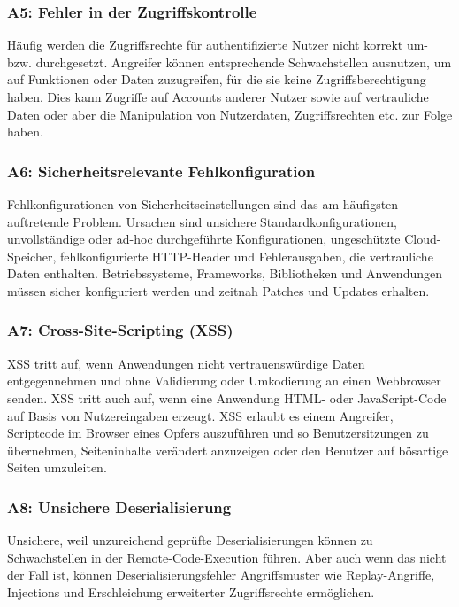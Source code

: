 \documentclass[12pt,oneside,a4paper,parskip]{scrbook}
\begin{document}
    \subsubsection{A5: Fehler in der Zugriffskontrolle}
    Häufig werden die Zugriffsrechte für authentifizierte Nutzer nicht korrekt um- bzw. durchgesetzt.
    Angreifer können entsprechende Schwachstellen ausnutzen, um auf Funktionen oder Daten
    zuzugreifen, für die sie keine Zugriffsberechtigung haben. Dies kann Zugriffe auf Accounts
    anderer Nutzer sowie auf vertrauliche Daten oder aber die Manipulation von Nutzerdaten,
    Zugriffsrechten etc. zur Folge haben.

    \subsubsection{A6: Sicherheitsrelevante Fehlkonfiguration}
    Fehlkonfigurationen von Sicherheitseinstellungen sind das am häufigsten auftretende Problem.
    Ursachen sind unsichere Standardkonfigurationen, unvollständige oder ad-hoc durchgeführte
    Konfigurationen, ungeschützte Cloud-Speicher, fehlkonfigurierte HTTP-Header und Fehlerausgaben,
    die vertrauliche Daten enthalten. Betriebssysteme, Frameworks, Bibliotheken und Anwendungen
    müssen sicher konfiguriert werden und zeitnah Patches und Updates erhalten.

    \subsubsection{A7: Cross-Site-Scripting (XSS)}
    XSS tritt auf, wenn Anwendungen nicht vertrauenswürdige Daten entgegennehmen und ohne
    Validierung oder Umkodierung an einen Webbrowser senden. XSS tritt auch auf, wenn eine
    Anwendung HTML- oder JavaScript-Code auf Basis von Nutzereingaben erzeugt. XSS erlaubt es
    einem Angreifer, Scriptcode im Browser eines Opfers auszuführen und so Benutzersitzungen zu
    übernehmen, Seiteninhalte verändert anzuzeigen oder den Benutzer auf bösartige Seiten
    umzuleiten.

    \subsubsection{A8: Unsichere Deserialisierung}
    Unsichere, weil unzureichend geprüfte Deserialisierungen können zu Schwachstellen in der
    Remote-Code-Execution führen. Aber auch wenn das nicht der Fall ist, können
    Deserialisierungsfehler Angriffsmuster wie Replay-Angriffe, Injections und Erschleichung
    erweiterter Zugriffsrechte ermöglichen.
\end{document}
